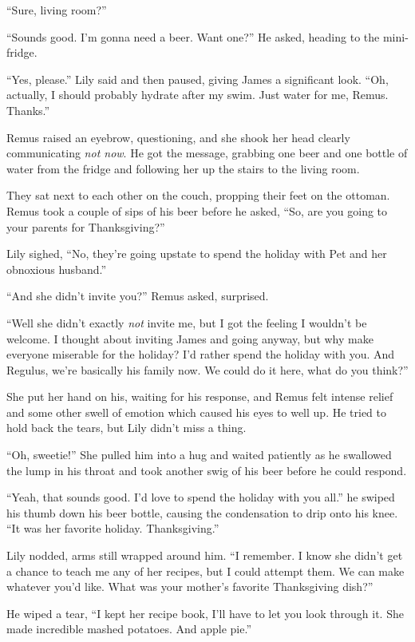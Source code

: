 \documentclass[12pt,twoside,openright]{memoir}
\begin{document}
``Sure, living room?'' 

``Sounds good. I'm gonna need a beer. Want one?'' He asked, heading to the mini-fridge.

``Yes, please.'' Lily said and then paused, giving James a significant look. ``Oh, actually, I should probably hydrate after my swim. Just water for me, Remus. Thanks.''

Remus raised an eyebrow, questioning, and she shook her head clearly communicating \textit{not now}. He got the message, grabbing one beer and one bottle of water from the fridge and following her up the stairs to the living room.

They sat next to each other on the couch, propping their feet on the ottoman. Remus took a couple of sips of his beer before he asked, ``So, are you going to your parents for Thanksgiving?'' 

Lily sighed, ``No, they're going upstate to spend the holiday with Pet and her obnoxious husband.''

``And she didn't invite you?'' Remus asked, surprised. 

``Well she didn't exactly \textit{not} invite me, but I got the feeling I wouldn't be welcome. I thought about inviting James and going anyway, but why make everyone miserable for the holiday? I'd rather spend the holiday with you. And Regulus, we're basically his family now. We could do it here, what do you think?''

She put her hand on his, waiting for his response, and Remus felt intense relief and some other swell of emotion which caused his eyes to well up. He tried to hold back the tears, but Lily didn't miss a thing. 

``Oh, sweetie!'' She pulled him into a hug and waited patiently as he swallowed the lump in his throat and took another swig of his beer before he could respond. 

``Yeah, that sounds good. I'd love to spend the holiday with you all.'' he swiped his thumb down his beer bottle, causing the condensation to drip onto his knee. ``It was her favorite holiday. Thanksgiving.''

Lily nodded, arms still wrapped around him. ``I remember. I know she didn't get a chance to teach me any of her recipes, but I could attempt them. We can make whatever you'd like. What was your mother's favorite Thanksgiving dish?'' 

He wiped a tear, ``I kept her recipe book, I'll have to let you look through it. She made incredible mashed potatoes. And apple pie.''
\end{document}
